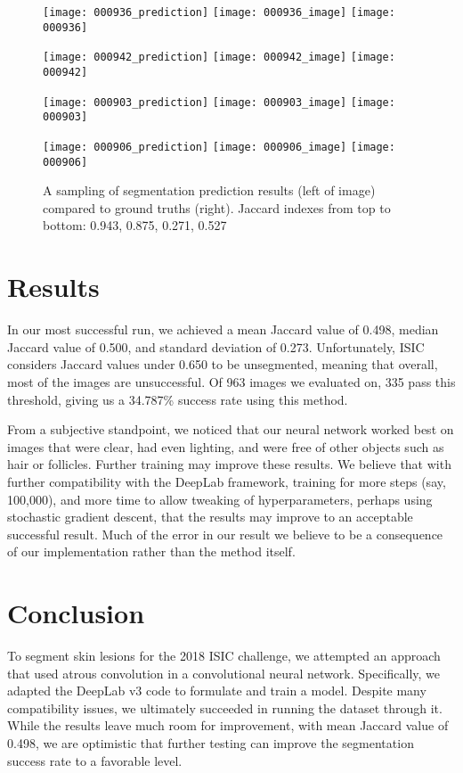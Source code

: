 \documentclass[11pt, letterpaper]{article}
\begin{document}
\begin{center}
\begin{figure}[t]
\centering
\caption{A sampling of segmentation prediction results (left of image) compared to ground truths (right). Jaccard indexes from top to bottom: 0.943, 0.875, 0.271, 0.527}

\texttt{[image: 000936\_prediction]}
\texttt{[image: 000936\_image]}
\texttt{[image: 000936]}

\texttt{[image: 000942\_prediction]}
\texttt{[image: 000942\_image]}
\texttt{[image: 000942]}

\texttt{[image: 000903\_prediction]}
\texttt{[image: 000903\_image]}
\texttt{[image: 000903]}

\texttt{[image: 000906\_prediction]}
\texttt{[image: 000906\_image]}
\texttt{[image: 000906]}
\end{figure}
\end{center}

\section{Results}
In our most successful run, we achieved a mean Jaccard value of 0.498, median Jaccard value of 0.500, and standard deviation of 0.273. Unfortunately, ISIC considers Jaccard values under 0.650 to be unsegmented, meaning that overall, most of the images are unsuccessful. Of 963 images we evaluated on, 335 pass this threshold, giving us a 34.787\% success rate using this method.

From a subjective standpoint, we noticed that our neural network worked best on images that were clear, had even lighting, and were free of other objects such as hair or follicles. Further training may improve these results. We believe that with further compatibility with the DeepLab framework, training for more steps (say, 100,000), and more time to allow tweaking of hyperparameters, perhaps using stochastic gradient descent, that the results may improve to an  acceptable successful result. Much of the error in our result we believe to be a consequence of our implementation rather than the method itself.

\section{Conclusion}
	To segment skin lesions for the 2018 ISIC challenge, we attempted an approach that used atrous convolution in a convolutional neural network. Specifically, we adapted the DeepLab v3 code to formulate and train a model. Despite many compatibility issues, we ultimately succeeded in running the dataset through it. While the results leave much room for improvement, with mean Jaccard value of 0.498, we are optimistic that further testing can improve the segmentation success rate to a favorable level.
\end{document}
